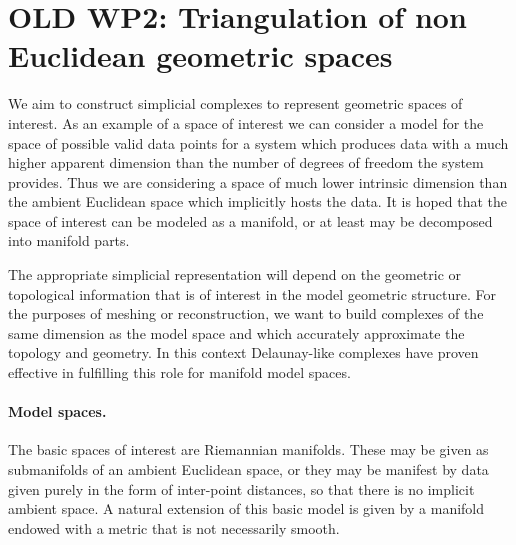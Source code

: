 %
%



%


\section*{OLD WP2: Triangulation of non Euclidean geometric spaces}

We aim to construct simplicial complexes to represent
geometric spaces of interest. As an example of a space of interest we
can consider a model for the space of possible valid data points for a
system which produces data with a much higher apparent dimension than
the number of degrees of freedom  the system provides. Thus we are
considering a space of much lower intrinsic dimension than the ambient
Euclidean space which implicitly hosts the data. It is hoped that the
space of interest can be modeled as a manifold, or at least may be
decomposed into manifold parts. 

The appropriate simplicial representation will depend on the geometric
or topological information that is of interest in the model geometric
structure. For the purposes of meshing or reconstruction, we want to
build complexes of the same dimension as the model space and which
accurately approximate the topology and geometry. In this context
Delaunay-like complexes have proven effective in fulfilling this role
for manifold model spaces.


\paragraph{Model spaces.} 
The basic spaces of interest are Riemannian manifolds. These may be
given as submanifolds of an ambient Euclidean space, or they may be
manifest by data given purely in the form of inter-point distances, so
that there is no implicit ambient space.  
A natural extension of this basic model is given by a manifold endowed
with a metric that is not necessarily smooth. 

